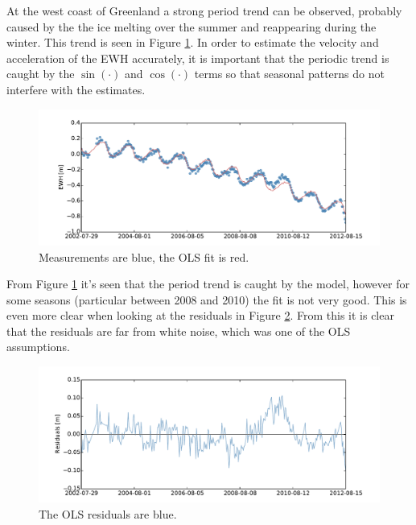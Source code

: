 At the west coast of Greenland a strong period trend can be observed, probably caused by the the ice melting over the summer and reappearing during the winter. This trend is seen in Figure \ref{fig:ols-selected-0-fit}. In order to estimate the velocity and acceleration of the EWH accurately, it is important that the periodic trend is caught by the $\sin(\cdot)$ and $\cos(\cdot)$ terms so that seasonal patterns do not interfere with the estimates.
\begin{figure}[H]
	\centering
	\includegraphics[width=\textwidth]{figures/ols-selected-0-fit}
	\caption{Measurements are blue, the OLS fit is red.}
	\label{fig:ols-selected-0-fit}
\end{figure}
 
From Figure \ref{fig:ols-selected-0-fit} it's seen that the period trend is caught by the model, however for some seasons (particular between 2008 and 2010) the fit is not very good. This is even more clear when looking at the residuals in Figure \ref{fig:ols-selected-0-residual}. From this it is clear that the residuals are far from white noise, which was one of the OLS assumptions.
\begin{figure}[H]
	\centering
	\includegraphics[width=\textwidth]{figures/ols-selected-0-residual}
	\caption{The OLS residuals are blue.}
	\label{fig:ols-selected-0-residual}
\end{figure}

